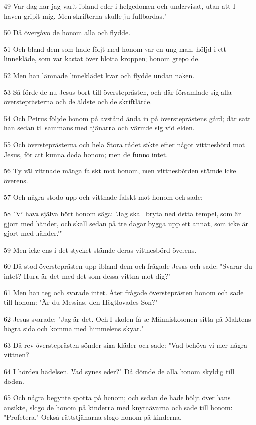 \par 49 Var dag har jag varit ibland eder i helgedomen och undervisat, utan att I haven gripit mig. Men skrifterna skulle ju fullbordas."
\par 50 Då övergåvo de honom alla och flydde.
\par 51 Och bland dem som hade följt med honom var en ung man, höljd i ett linnekläde, som var kastat över blotta kroppen; honom grepo de.
\par 52 Men han lämnade linneklädet kvar och flydde undan naken.
\par 53 Så förde de nu Jesus bort till översteprästen, och där församlade sig alla översteprästerna och de äldste och de skriftlärde.
\par 54 Och Petrus följde honom på avstånd ända in på översteprästens gård; där satt han sedan tillsammans med tjänarna och värmde sig vid elden.
\par 55 Och översteprästerna och hela Stora rådet sökte efter något vittnesbörd mot Jesus, för att kunna döda honom; men de funno intet.
\par 56 Ty väl vittnade många falskt mot honom, men vittnesbörden stämde icke överens.
\par 57 Och några stodo upp och vittnade falskt mot honom och sade:
\par 58 "Vi hava själva hört honom säga: 'Jag skall bryta ned detta tempel, som är gjort med händer, och skall sedan på tre dagar bygga upp ett annat, som icke är gjort med händer.'"
\par 59 Men icke ens i det stycket stämde deras vittnesbörd överens.
\par 60 Då stod översteprästen upp ibland dem och frågade Jesus och sade: "Svarar du intet? Huru är det med det som dessa vittna mot dig?"
\par 61 Men han teg och svarade intet. Åter frågade översteprästen honom och sade till honom: "Är du Messias, den Högtlovades Son?"
\par 62 Jesus svarade: "Jag är det. Och I skolen få se Människosonen sitta på Maktens högra sida och komma med himmelens skyar."
\par 63 Då rev översteprästen sönder sina kläder och sade: "Vad behöva vi mer några vittnen?
\par 64 I hörden hädelsen. Vad synes eder?" Då dömde de alla honom skyldig till döden.
\par 65 Och några begynte spotta på honom; och sedan de hade höljt över hans ansikte, slogo de honom på kinderna med knytnävarna och sade till honom: "Profetera." Också rättstjänarna slogo honom på kinderna.
